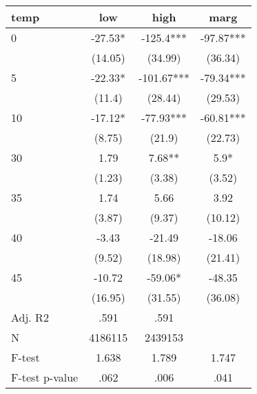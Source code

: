\documentclass[]{article}
\begin{document}
\begin{tabular}{lccc} \hline
temp & low & high & marg \\ \hline
0 & -27.53* & -125.4*** & -97.87*** \\
 & (14.05) & (34.99) & (36.34) \\
5 & -22.33* & -101.67*** & -79.34*** \\
 & (11.4) & (28.44) & (29.53) \\
10 & -17.12* & -77.93*** & -60.81*** \\
 & (8.75) & (21.9) & (22.73) \\
30 & 1.79 & 7.68** & 5.9* \\
 & (1.23) & (3.38) & (3.52) \\
35 & 1.74 & 5.66 & 3.92 \\
 & (3.87) & (9.37) & (10.12) \\
40 & -3.43 & -21.49 & -18.06 \\
 & (9.52) & (18.98) & (21.41) \\
45 & -10.72 & -59.06* & -48.35 \\
 & (16.95) & (31.55) & (36.08) \\
\hline Adj. R2 & .591 & .591 &  \\
N & 4186115 & 2439153 &  \\
F-test & 1.638 & 1.789 & 1.747 \\
 F-test p-value & .062 & .006 & .041 \\ \hline
\end{tabular}
\end{document}
